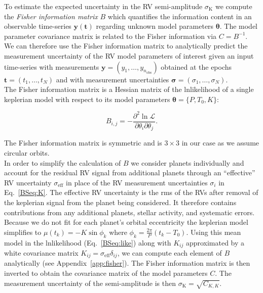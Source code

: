 To estimate the expected uncertainty in the RV semi-amplitude $\sigma_{\text{K}}$ we compute the
\emph{Fisher information matrix} $B$ which quantifies the information content in an observable time-series
$\mathbf{y}(\mathbf{t})$ regarding unknown model parameters $\boldsymbol{\theta}$. The model parameter
covariance matrix is related to the Fisher information via $C=B^{-1}$. We can therefore
use the Fisher information matrix to analytically predict the measurement uncertainty of the RV model
parameters of interest given an input time-series with \nobs{} measurements $\mathbf{y}=(y_1,\dots,y_{n_{\text{obs}}})$
obtained at the epochs $\mathbf{t}=(t_1,\dots,t_N)$ and with measurement uncertainties
$\boldsymbol{\sigma}=(\sigma_1,\dots,\sigma_N)$. \\

The Fisher information matrix is a Hessian matrix of the lnlikelihood of a single keplerian model 
with respect to its model parameters $\boldsymbol{\theta}=\{P,T_0,K\}$:

\begin{equation}
  B_{i,j} = -\frac{\partial^2 \ln{\mathcal{L}}}{\partial \theta_i \partial \theta_j}.
\end{equation}

\noindent The Fisher information matrix is symmetric and is $3 \times 3$ in our case as
we assume circular orbits. \\

In order to simplify the calculation of 
$B$ we consider planets individually and account for the residual RV signal from additional planets
through an ``effective'' RV uncertainty $\sigma_{\text{eff}}$
in place of the RV measurement uncertainties $\sigma_i$
in Eq.~\ref{BSeq:K}. The effective RV uncertainty is the rms of the RVs
after removal of the keplerian signal from the planet being considered. It therefore contains
contributions from any additional planets, stellar activity, and systematic errors.
Because we do not fit for each planet's orbital eccentricity the
keplerian model simplifies to $\mu(t_k) = -K \sin{\phi_k}$ where $\phi_k = \frac{2\pi}{P} (t_k-T_0)$.
Using this mean model in the lnlikelihood (Eq.~\ref{BSeq:like}) along with $K_{ij}$ approximated by a
white covariance matrix $K_{ij} = \sigma_{\text{eff}} \delta_{ij}$, we can compute each element of $B$ analytically
(see Appendix~\ref{app:fisher}). The Fisher information matrix
is then inverted to obtain the covariance matrix of the model
parameters $C$. The measurement uncertainty of the semi-amplitude is then $\sigma_{\text{K}} = \sqrt{C_{K,K}}$.


